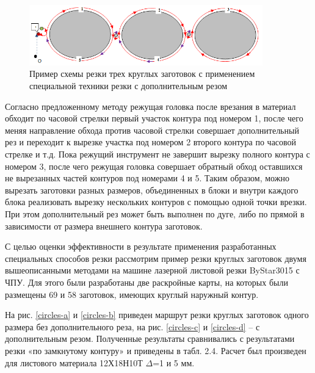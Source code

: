 \documentclass[12pt]{report}
\begin{document}
\begin{figure}
  \begin{center}
  \includegraphics[width=0.9\textwidth]{3-extra.png}
  \caption{Пример схемы резки трех круглых заготовок с применением специальной техники резки с дополнительным резом}
  \label{3-extra}
  \end{center}
\end{figure}

Согласно предложенному методу режущая головка
после врезания в материал обходит по часовой
стрелки первый участок контура под номером 1,
после чего меняя направление обхода против
часовой стрелки совершает дополнительный рез и
переходит к вырезке участка под номером 2 второго
контура по часовой стрелке и т.д.
Пока режущий инструмент не завершит
вырезку полного контура с номером 3,
после чего режущая головка совершает обратный обход
оставшихся не вырезанных частей контуров под номерами 4 и 5.
Таким образом, можно вырезать заготовки разных размеров,
объединенных в блоки и внутри каждого блока реализовать
вырезку нескольких контуров с помощью одной точки врезки.
При этом дополнительный рез может быть выполнен по дуге,
либо по прямой в зависимости от размера внешнего контура заготовок.

С целью оценки эффективности в результате применения
разработанных специальных способов резки рассмотрим
пример резки круглых заготовок двумя вышеописанными
методами на машине лазерной листовой резки ByStar3015 с ЧПУ.
Для этого были разработаны две раскройные карты,
на которых были размещены 69 и 58 заготовок,
имеющих круглый наружный контур.

На рис. \ref{circles-a} и \ref{circles-b}
приведен маршрут резки
круглых заготовок одного размера без дополнительного реза,
на рис. \ref{circles-c} и \ref{circles-d} – с дополнительным резом.
Полученные результаты сравнивались с результатами
резки «по замкнутому контуру» и приведены в табл. 2.4.
Расчет был произведен для листового материала 12Х18Н10Т $\Delta$=1 и 5 мм.
\end{document}

